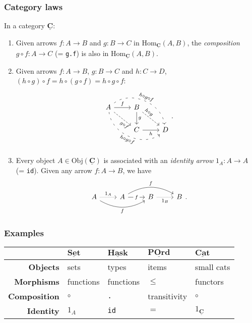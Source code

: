\documentclass[10pt]{beamer}
\newcommand{\Cat}[1]{\ensuremath{\underline{\mathbf{#1}}}}
\newcommand{\Obj}[1]{\ensuremath{\mathrm{Obj}(\Cat{#1})}}
\newcommand{\Hom}[3]{\ensuremath{\mathrm{Hom}_{\Cat{#1}}(#2,#3)}}
\theoremstyle{definition}
\theoremstyle{remark}
\numberwithin{equation}{section}
\begin{document}
\begin{frame}[fragile]
  \frametitle{Category laws}
  In a category $\Cat{C}$:
  \begin{enumerate}
  \item Given arrows $f\colon A \rightarrow B$ and $g\colon B \rightarrow C$ in
    $\Hom{C}{A}{B}$, the \emph{composition} $g \circ f \colon A \rightarrow C$ (= \texttt{g.f}) is also in
    $\Hom{C}{A}{B}$.
  \item Given arrows $f\colon A \rightarrow B$, $g\colon B \rightarrow C$ and $h\colon C \rightarrow D$, $(h \circ
    g) \circ f = h \circ (g \circ f) = h \circ g \circ f$:\vspace{-0.5\baselineskip}
    \[
      \begin{tikzcd}
        A \arrow{r}{f} \arrow[sloped,near end,swap,dashed]{dr}{g \circ f} \arrow[bend
        right=60,sloped,swap,loosely dashed]{drr}{h \circ g \circ f} \arrow[bend
        left=60,sloped,loosely dashed]{drr}{h
          \circ g \circ f} & B \arrow{d}{g}
        \arrow[sloped,near start,dashed]{dr}{h \circ g} & \\
          & C \arrow[swap]{r}{h} & D
      \end{tikzcd}\rlap{.}
    \]
  \item Every object $A \in \Obj{C}$ is associated with an \emph{identity arrow}
    $1_A \colon A \rightarrow A$ (= \texttt{id}). Given any arrow $f\colon A \rightarrow B$, we have
    \[
      \begin{tikzcd}
        A \arrow[densely dotted]{r}{1_A} \arrow[bend right=30,swap]{rr}{f} & A
        \arrow["f" description]{r}
        \arrow[bend left=30]{rr}{f} & B \arrow[swap,densely dotted]{r}{1_B} & B
      \end{tikzcd}\rlap{.}
    \]
  \end{enumerate}
\end{frame}

\begin{frame}[fragile]
  \frametitle{Examples}
  \begin{tabular}{r l l l l}\toprule
    & $\Cat{Set}$ & $\Cat{Hask}$ & $\Cat{POrd}$ & $\Cat{Cat}$ \\\midrule
    \textbf{Objects} & sets & types & items & small cats \\
    \textbf{Morphisms} & functions & functions & $\leq$ & functors \\
    \textbf{Composition} & $\circ$ & \texttt{.} & transitivity & $\circ$ \\
    \textbf{Identity} & $1_A$ & \texttt{id} & $=$ & $1_{\Cat{C}}$ \\\bottomrule
  \end{tabular}
\end{frame}
\end{document}
